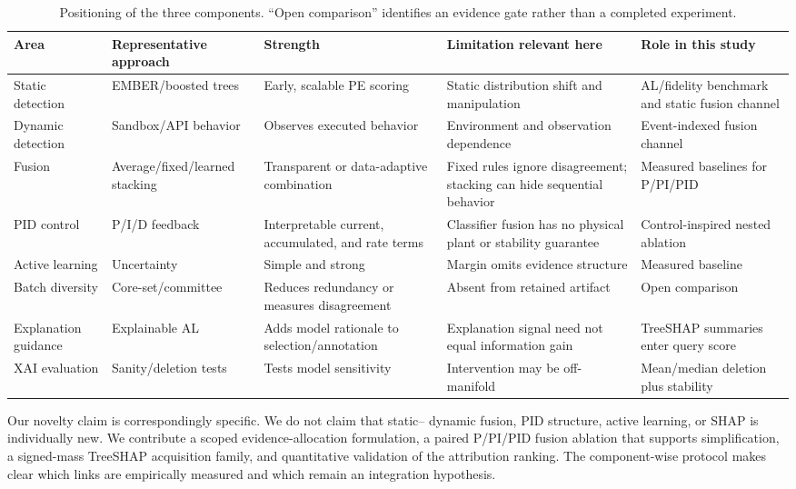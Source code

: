 \begin{table}[t]
\centering
\caption{Positioning of the three components. “Open comparison” identifies an
evidence gate rather than a completed experiment.}
\label{tab:related}
\scriptsize
\setlength{\tabcolsep}{2.5pt}
\begin{tabular}{p{2.8cm}p{3.4cm}p{2.8cm}p{2.8cm}p{3.2cm}}
\toprule
Area & Representative approach & Strength & Limitation relevant here & Role in this study \\
\midrule
Static detection & EMBER/boosted trees \cite{anderson2018ember,ke2017lightgbm} & Early, scalable PE scoring & Static distribution shift and manipulation & AL/fidelity benchmark and static fusion channel \\
Dynamic detection & Sandbox/API behavior \cite{sgandurra2016automated} & Observes executed behavior & Environment and observation dependence & Event-indexed fusion channel \\
Fusion & Average/fixed/learned stacking & Transparent or data-adaptive combination & Fixed rules ignore disagreement; stacking can hide sequential behavior & Measured baselines for P/PI/PID \\
PID control & P/I/D feedback \cite{astrom2001future} & Interpretable current, accumulated, and rate terms & Classifier fusion has no physical plant or stability guarantee & Control-inspired nested ablation \\
Active learning & Uncertainty \cite{cohn1996active} & Simple and strong & Margin omits evidence structure & Measured baseline \\
Batch diversity & Core-set/committee \cite{sener2018active,beluch2018power} & Reduces redundancy or measures disagreement & Absent from retained artifact & Open comparison \\
Explanation guidance & Explainable AL \cite{ghai2021explainable} & Adds model rationale to selection/annotation & Explanation signal need not equal information gain & TreeSHAP summaries enter query score \\
XAI evaluation & Sanity/deletion tests \cite{adebayo2018sanity,hooker2019benchmark} & Tests model sensitivity & Intervention may be off-manifold & Mean/median deletion plus stability \\
\bottomrule
\end{tabular}
\end{table}

Our novelty claim is correspondingly specific. We do not claim that static--
dynamic fusion, PID structure, active learning, or SHAP is individually new. We
contribute a scoped evidence-allocation formulation, a paired P/PI/PID fusion
ablation that supports simplification, a signed-mass TreeSHAP acquisition family,
and quantitative validation of the attribution ranking. The component-wise
protocol makes clear which links are empirically measured and which remain an
integration hypothesis.
